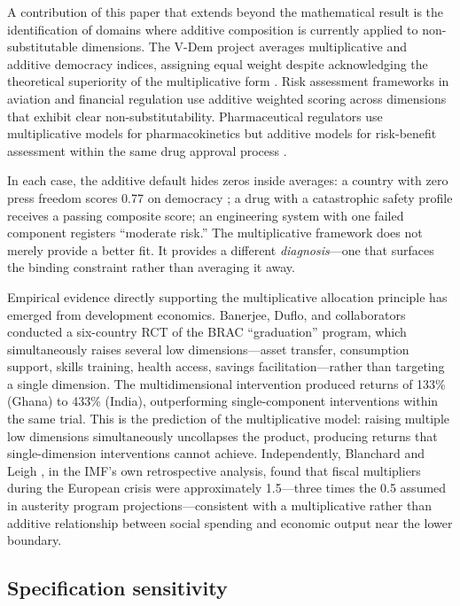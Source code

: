 \documentclass[12pt, a4paper]{article}
\theoremstyle{definition}
\theoremstyle{remark}
\begin{document}
A contribution of this paper that extends beyond the mathematical result is the identification of domains where additive composition is currently applied to non-substitutable dimensions. The V-Dem project averages multiplicative and additive democracy indices, assigning equal weight despite acknowledging the theoretical superiority of the multiplicative form \cite{coppedge2018}. Risk assessment frameworks in aviation and financial regulation use additive weighted scoring across dimensions that exhibit clear non-substitutability. Pharmaceutical regulators use multiplicative models for pharmacokinetics but additive models for risk-benefit assessment within the same drug approval process \cite{fda2003}.

In each case, the additive default hides zeros inside averages: a country with zero press freedom scores 0.77 on democracy \cite{kirsch2026audit}; a drug with a catastrophic safety profile receives a passing composite score; an engineering system with one failed component registers ``moderate risk.'' The multiplicative framework does not merely provide a better fit. It provides a different \textit{diagnosis}---one that surfaces the binding constraint rather than averaging it away.

Empirical evidence directly supporting the multiplicative allocation principle has emerged from development economics. Banerjee, Duflo, and collaborators \cite{banerjee2015} conducted a six-country RCT of the BRAC ``graduation'' program, which simultaneously raises several low dimensions---asset transfer, consumption support, skills training, health access, savings facilitation---rather than targeting a single dimension. The multidimensional intervention produced returns of 133\% (Ghana) to 433\% (India), outperforming single-component interventions within the same trial. This is the prediction of the multiplicative model: raising multiple low dimensions simultaneously uncollapses the product, producing returns that single-dimension interventions cannot achieve. Independently, Blanchard and Leigh \cite{blanchard2013}, in the IMF's own retrospective analysis, found that fiscal multipliers during the European crisis were approximately 1.5---three times the 0.5 assumed in austerity program projections---consistent with a multiplicative rather than additive relationship between social spending and economic output near the lower boundary.

\subsection{Specification sensitivity}
\end{document}
